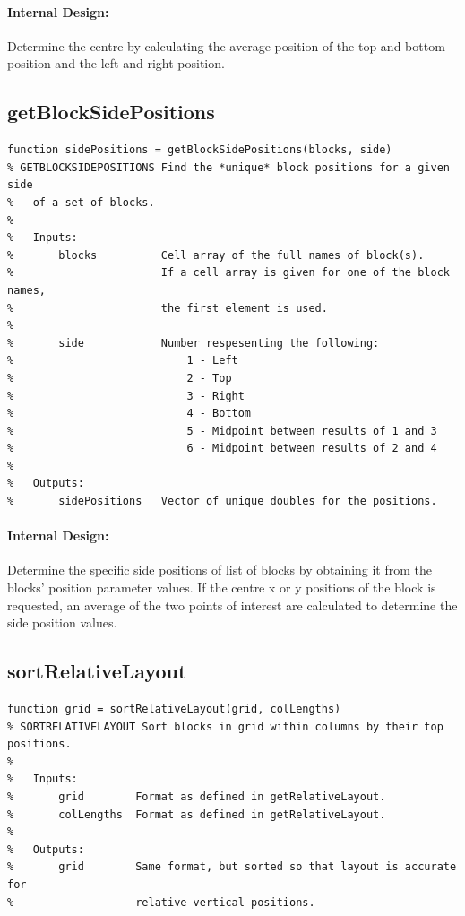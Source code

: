 \documentclass[12pt,letterpaper]{report}
\begin{document}
\paragraph{Internal Design:} Determine the centre by calculating the average position of the top and bottom position and the left and right position.

\subsection{getBlockSidePositions} \label{getBlockSidePositions}
\begin{lstlisting}
function sidePositions = getBlockSidePositions(blocks, side)
% GETBLOCKSIDEPOSITIONS Find the *unique* block positions for a given side
%   of a set of blocks.
%
%   Inputs:
%       blocks          Cell array of the full names of block(s).
%                       If a cell array is given for one of the block names,
%                       the first element is used.
%
%       side            Number respesenting the following:
%                           1 - Left
%                           2 - Top
%                           3 - Right
%                           4 - Bottom
%                           5 - Midpoint between results of 1 and 3
%                           6 - Midpoint between results of 2 and 4
%
%   Outputs:
%       sidePositions   Vector of unique doubles for the positions.
\end{lstlisting}
\paragraph{Internal Design:} Determine the specific side positions of list of blocks by obtaining it from the blocks' position parameter values. If the centre x or y positions of the block is requested, an average of the two points of interest are calculated to determine the side position values.

\subsection{sortRelativeLayout} \label{sortRelativeLayout}
\begin{lstlisting}
function grid = sortRelativeLayout(grid, colLengths)
% SORTRELATIVELAYOUT Sort blocks in grid within columns by their top positions.
%
%   Inputs:
%       grid        Format as defined in getRelativeLayout.
%       colLengths  Format as defined in getRelativeLayout.
%
%   Outputs:
%       grid        Same format, but sorted so that layout is accurate for
%                   relative vertical positions.
\end{lstlisting}
\end{document}

